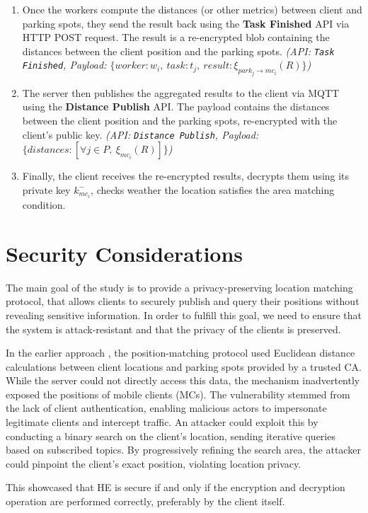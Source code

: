 \begin{enumerate}
    \item Once the workers compute the distances (or other metrics) between client and parking spots, they send the result back using the \textbf{Task Finished} API via HTTP POST request. The result is a re-encrypted blob containing the distances between the client position and the parking spots. \emph{(API: \texttt{Task Finished}, Payload: $\{worker: w_i,\ task: t_j,\ result: \xi_{park_j \to mc_i}(R)\}$)}
    \item The server then publishes the aggregated results to the client via MQTT using the \textbf{Distance Publish} API. The payload contains the distances between the client position and the parking spots, re-encrypted with the client's public key. \emph{(API: \texttt{Distance Publish}, Payload: $\{distances: [\forall j \in P,\ \xi_{mc_i}(R)]\}$)}
    \item Finally, the client receives the re-encrypted results, decrypts them using its private key $k_{mc_i}^-$, checks weather the location satisfies the area matching condition.
\end{enumerate}

\section{Security Considerations}

The main goal of the study is to provide a privacy-preserving location matching protocol, that allows clients to securely publish and query their positions without revealing sensitive information. In order to fulfill this goal, we need to ensure that the system is attack-resistant and that the privacy of the clients is preserved.

In the earlier approach \cite{genova2024helamqtt}, the position-matching protocol used Euclidean distance calculations between client locations and parking spots provided by a trusted CA. While the server could not directly access this data, the mechanism inadvertently exposed the positions of mobile clients (MCs). The vulnerability stemmed from the lack of client authentication, enabling malicious actors to impersonate legitimate clients and intercept traffic. An attacker could exploit this by conducting a binary search on the client’s location, sending iterative queries based on subscribed topics. By progressively refining the search area, the attacker could pinpoint the client’s exact position, violating location privacy.

This showcased that HE is secure if and only if the encryption and decryption operation are performed correctly, preferably by the client itself.

